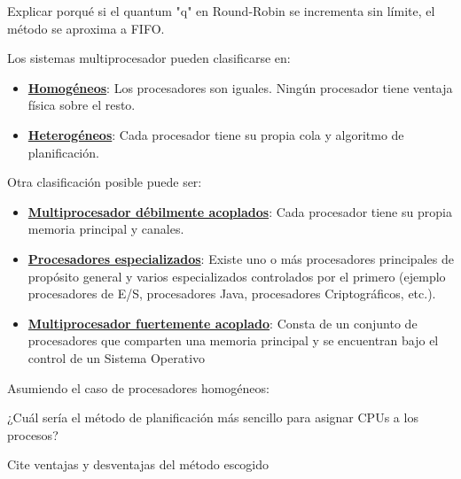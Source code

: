 \begin{questions}
\question Explicar porqué si el quantum "q" en Round-Robin se incrementa sin límite, el método se aproxima a FIFO.

\question Los sistemas multiprocesador pueden clasificarse en:
\begin{itemize}
	\item \underline{\textbf{Homogéneos}}: Los procesadores son iguales. Ningún procesador tiene ventaja física sobre el resto.
	\item \underline{\textbf{Heterogéneos}}: Cada procesador tiene su propia cola y algoritmo de planificación.
\end{itemize}
Otra clasificación posible puede ser:
\begin{itemize}
	\item \underline{\textbf{Multiprocesador débilmente acoplados}}: Cada procesador tiene su propia memoria principal y canales.
	\item \underline{\textbf{Procesadores especializados}}: Existe uno o más procesadores principales de propósito general y varios especializados controlados por el primero (ejemplo procesadores de E/S, procesadores Java, procesadores Criptográficos, etc.).
	\item \underline{\textbf{Multiprocesador fuertemente acoplado}}: Consta de un conjunto de procesadores que comparten una memoria principal y se encuentran bajo el control de un Sistema Operativo
\end{itemize}

\question Asumiendo el caso de procesadores homogéneos:
\begin{parts}
	\item ¿Cuál sería el método de planificación más sencillo para asignar CPUs a los procesos?
	\item Cite ventajas y desventajas del método escogido
\end{parts}


\end{questions}
